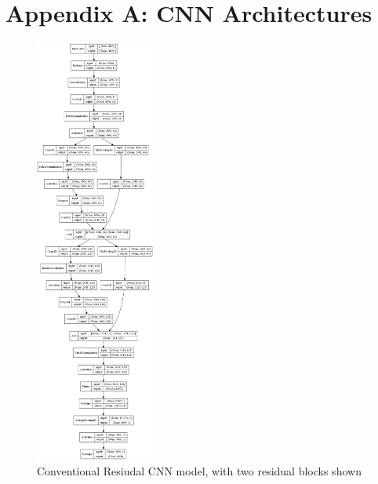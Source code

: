 \documentclass[9pt,conference]{IEEEtran}
\begin{document}



\section{Appendix A: CNN Architectures}

\begin{figure}[H]
    \centering
    \includegraphics[width=0.35\textwidth]{stanfordmod.png}
    \caption{Conventional Resiudal CNN model, with two residual blocks shown}
\end{figure}
\end{document}
